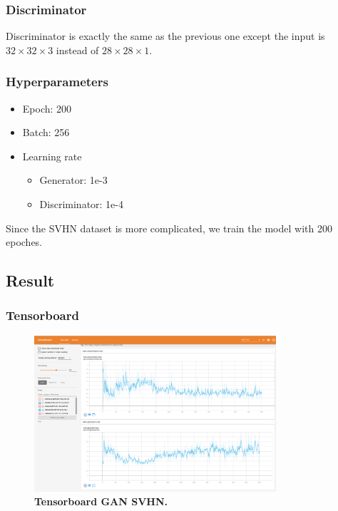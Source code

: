 \documentclass{article}
\newcommand{\mycaption}[2]{\caption[#1]{\textbf{#1.} #2}}
\begin{document}
\subsubsection{Discriminator}

Discriminator is exactly the same as the previous one except the input is $32\times 32\times 3$ instead of $28\times 28\times 1$.

\subsubsection{Hyperparameters}

\begin{itemize}
  \item Epoch: 200
  \item Batch: 256
  \item Learning rate
    \begin{itemize}
      \item Generator: 1e-3
      \item Discriminator: 1e-4
    \end{itemize}
\end{itemize}

Since the SVHN dataset is more complicated, we train the model with 200 epoches.

\subsection{Result}

\subsubsection{Tensorboard}

\begin{figure}[!htb]
  \centering
  \includegraphics[width=0.8\textwidth]{imgs/tensorboard-GAN-SVHN.png}
  \mycaption{Tensorboard GAN SVHN}{}
  \label{fig_TB_GAN_SVHN}
\end{figure}
\end{document}
